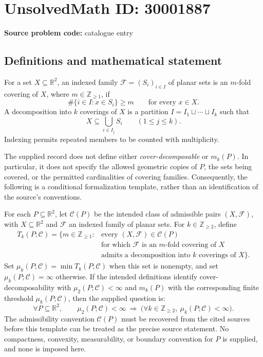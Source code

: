 \documentclass[11pt]{article}
\newcommand{\Z}{\mathbb{Z}}
\newcommand{\R}{\mathbb{R}}
\begin{document}
\section*{UnsolvedMath ID: 30001887}
\textbf{Source problem code:} catalogue entry
\subsection{Definitions and mathematical statement}
For a set \(X\subseteq\R^2\), an indexed family \(\mathcal F=(S_i)_{i\in I}\) of planar sets is an \(m\)-fold covering of \(X\), where \(m\in\Z_{\geq1}\), if
\[
\#\{i\in I:x\in S_i\}\geq m\qquad\text{for every }x\in X.
\]
A decomposition into \(k\) coverings of \(X\) is a partition \(I=I_1\sqcup\cdots\sqcup I_k\) such that
\[
X\subseteq\bigcup_{i\in I_j}S_i\qquad(1\leq j\leq k).
\]
Indexing permits repeated members to be counted with multiplicity.

The supplied record does not define either \emph{cover-decomposable} or \(m_k(P)\). In particular, it does not specify the allowed geometric copies of \(P\), the sets being covered, or the permitted cardinalities of covering families. Consequently, the following is a conditional formalization template, rather than an identification of the source's conventions.

For each \(P\subseteq\R^2\), let \(\mathcal C(P)\) be the intended class of admissible pairs \((X,\mathcal F)\), with \(X\subseteq\R^2\) and \(\mathcal F\) an indexed family of planar sets. For \(k\in\Z_{\geq2}\), define
\[
\begin{split}
T_k(P;\mathcal C)=\{m\in\Z_{\geq1}:{}&\text{every }(X,\mathcal F)\in\mathcal C(P)\\
&\text{for which }\mathcal F\text{ is an }m\text{-fold covering of }X\\
&\text{admits a decomposition into }k\text{ coverings of }X\}.
\end{split}
\]
Set \(\mu_k(P;\mathcal C)=\min T_k(P;\mathcal C)\) when this set is nonempty, and set \(\mu_k(P;\mathcal C)=\infty\) otherwise. If the intended definitions identify cover-decomposability with \(\mu_2(P;\mathcal C)<\infty\) and \(m_k(P)\) with the corresponding finite threshold \(\mu_k(P;\mathcal C)\), then the supplied question is:
\[
\forall P\subseteq\R^2,\qquad
\mu_2(P;\mathcal C)<\infty
\ \Longrightarrow\
\bigl(\forall k\in\Z_{\geq2},\ \mu_k(P;\mathcal C)<\infty\bigr).
\]
The admissibility convention \(\mathcal C(P)\) must be recovered from the cited sources before this template can be treated as the precise source statement. No compactness, convexity, measurability, or boundary convention for \(P\) is supplied, and none is imposed here.
\end{document}
